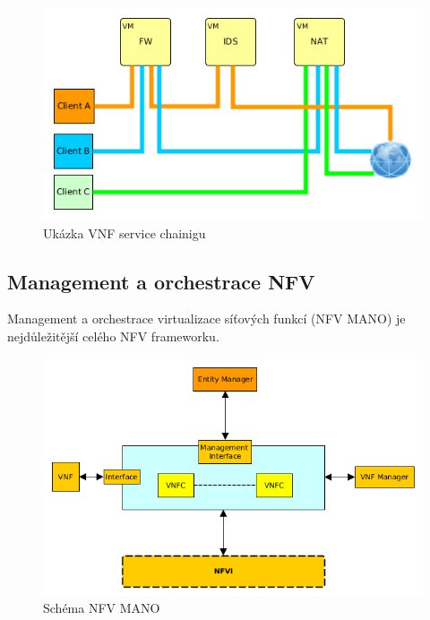 \begin{figure}[h]
\begin{centering}
\includegraphics[scale=0.55]{images/service_chaining_new}
\par\end{centering}
\caption{Ukázka VNF service chainigu\label{fig:service_chaining_new}}
\end{figure}

\subsection{Management a orchestrace NFV}

Management a orchestrace virtualizace síťových funkcí (NFV MANO) je nejdůležitější celého NFV frameworku. 

\begin{figure}[h]
\begin{centering}
\includegraphics[scale=0.65]{images/VNF}
\par\end{centering}
\caption{Schéma NFV MANO\label{fig:VNF}}
\end{figure}



